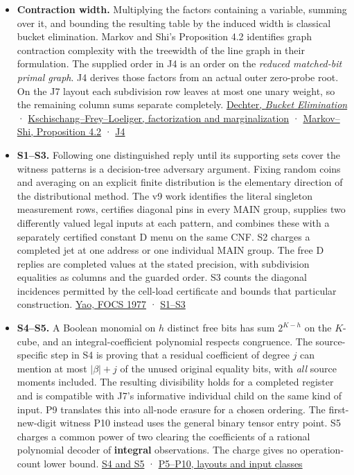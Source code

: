 \documentclass[11pt,a4paper]{article}
\providecommand{\tightlist}{\setlength{\itemsep}{0pt}\setlength{\parskip}{0pt}}
\begin{document}
\begin{itemize}
\tightlist
\item
  \textbf{Contraction width.} Multiplying the factors containing a
  variable, summing over it, and bounding the resulting table by the
  induced width is classical bucket elimination. Markov and Shi's
  Proposition 4.2 identifies graph contraction complexity with the
  treewidth of the line graph in their formulation. The supplied order
  in J4 is an order on the \emph{reduced matched-bit primal graph}. J4
  derives those factors from an actual outer zero-probe root. On the J7
  layout each subdivision row leaves at most one unary weight, so the
  remaining column sums separate completely.
  \href{https://ics.uci.edu/~dechter/publications/r48b.pdf}{Dechter,
  \emph{Bucket Elimination}} ·
  \href{https://www.mit.edu/~6.454/www_fall_2002/lizhong/factorgraph.pdf}{Kschischang--Frey--Loeliger,
  factorization and marginalization} ·
  \href{https://arxiv.org/pdf/quant-ph/0511069}{Markov--Shi, Proposition
  4.2} ·
  \hyperref[v9-j4-exact-contraction-of-an-outer-zero-probe-register]{J4}
\item
  \textbf{S1--S3.} Following one distinguished reply until its
  supporting sets cover the witness patterns is a decision-tree
  adversary argument. Fixing random coins and averaging on an explicit
  finite distribution is the elementary direction of the distributional
  method. The v9 work identifies the literal singleton measurement rows,
  certifies diagonal pins in every MAIN group, supplies two differently
  valued legal inputs at each pattern, and combines these with a
  separately certified constant D menu on the same CNF. S2 charges a
  completed jet at one address or one individual MAIN group. The free D
  replies are completed values at the stated precision, with subdivision
  equalities as columns and the guarded order. S3 counts the diagonal
  incidences permitted by the cell-load certificate and bounds that
  particular construction.
  \href{https://doi.org/10.1109/SFCS.1977.24}{Yao, FOCS 1977} ·
  \hyperref[v9-a-nonlinear-adaptive-obstruction-on-a-specified-native-interface]{S1--S3}
\item
  \textbf{S4--S5.} A Boolean monomial on \(h\) distinct free bits has
  sum \(2^{K-h}\) on the \(K\)-cube, and an integral-coefficient
  polynomial respects congruence. The source-specific step in S4 is
  proving that a residual coefficient of degree \(j\) can mention at
  most \(|\beta|+j\) of the unused original equality bits, with
  \emph{all} source moments included. The resulting divisibility holds
  for a completed register and is compatible with J7's informative
  individual child on the same kind of input. P9 translates this into
  all-node erasure for a chosen ordering. The first-new-digit witness
  P10 instead uses the general binary tensor entry point. S5 charges a
  common power of two clearing the coefficients of a rational polynomial
  decoder of \textbf{integral} observations. The charge gives no
  operation-count lower bound.
  \hyperref[v9-erasure-denominators-and-computation]{S4 and S5} ·
  \hyperref[v9-what-unused-equality-columns-force]{P5--P10, layouts and
  input classes}
\end{itemize}
\end{document}
